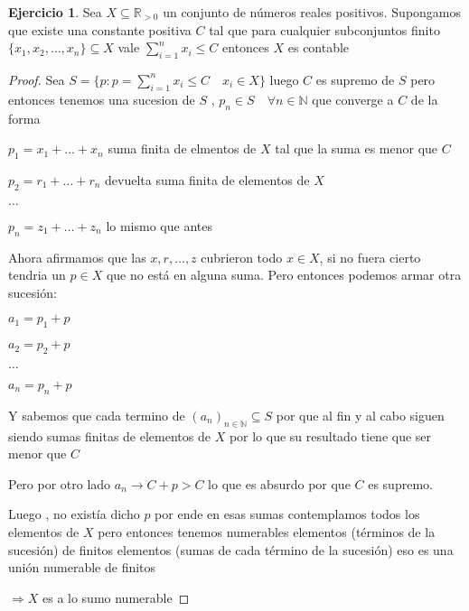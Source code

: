 \documentclass[12pt]{article}
\newcommand{\R}{\mathbb{R}}
\newcommand{\N}{\mathbb{N}}
\newcommand{\Ra}{\Rightarrow}
\newcommand{\ra}{\rightarrow}
\theoremstyle{definition}
\newtheorem{ej}{Ejercicio}
\begin{document}
\begin{ej} Sea $X \subseteq \R_{ >0 }$ un conjunto de números reales positivos. Supongamos que existe una constante positiva $C$ tal que para cualquier subconjuntos finito $\{x_{1},x_{2}, \dots ,x_{n}\} \subseteq X$ vale $\sum_{i =1}^{n} x_{i} \leq C$ entonces $X$ es contable

\begin{proof}
  Sea $S = \{p : p = \sum_{i = 1}^{n} x_{i} \leq C \quad x_{i} \in X\}$ luego $C$ es supremo de $S$ pero entonces tenemos una sucesion de $S$ , $p_{n} \in S \quad \forall n \in \N$ que converge a $C$ de la forma

  $p_{1} = x_{1} + \dots + x_{n}$ suma finita de elmentos de $X$ tal que la suma es menor que $C$

  $p_{2} = r_{1} + \dots + r_{n} $ devuelta suma finita de elementos de $X$

  $\dots$

  $p_{n} = z_{1} + \dots + z_{n}$ lo mismo que antes

  Ahora afirmamos que las $x,r, \dots ,z $ cubrieron todo $x \in X$, si no fuera cierto tendria un $p \in X $ que no está en alguna suma. Pero entonces podemos armar otra sucesión: 
  
  $a_{1} = p_{1} + p$
  
  $a_{2}=   p_{2}+p$
  
  $\dots$
  
  $a_{n} = p_{n} + p$

  Y sabemos que cada termino de $(a_{n})_{n \in \N} \subseteq S$ por que al fin y al cabo siguen siendo sumas finitas de elementos de $X$ por lo que su resultado tiene que ser menor que $C$

  Pero por otro lado $a_{n} \ra C + p > C$ lo que es absurdo por que $C$ es supremo. 

  Luego , no existía dicho $p$ por ende en esas sumas contemplamos todos los elementos de $X$ pero entonces tenemos numerables elementos (términos de la sucesión) de finitos elementos (sumas de cada término de la sucesión) eso es una unión numerable de finitos 

  $\Ra X$ es a lo sumo numerable

\end{proof}
\end{ej}
\end{document}
